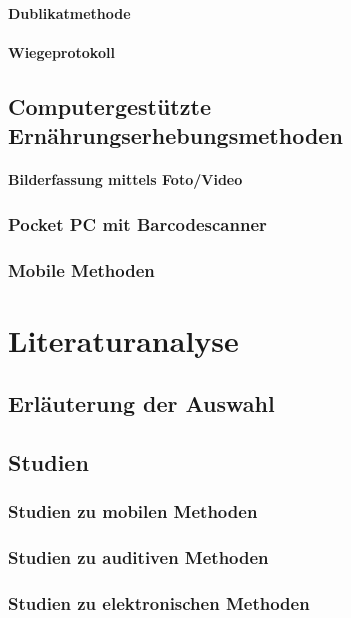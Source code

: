 \paragraph{Dublikatmethode}

\paragraph{Wiegeprotokoll}

\subsection{Computergestützte Ernährungserhebungsmethoden}

\paragraph{Bilderfassung mittels Foto/Video}

\subsubsection{Pocket PC mit Barcodescanner}

\subsubsection{Mobile Methoden}

\section{Literaturanalyse}

\subsection{Erläuterung der Auswahl}

\subsection{Studien}
\subsubsection{Studien zu mobilen Methoden}
\subsubsection{Studien zu auditiven Methoden}
\subsubsection{Studien zu elektronischen Methoden}




